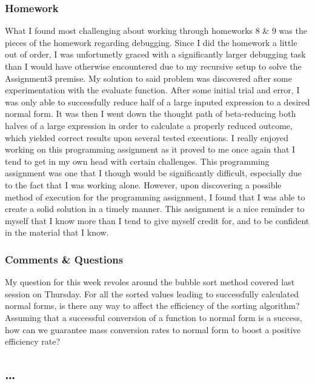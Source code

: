 \documentclass{article}
\theoremstyle{theorem}
\theoremstyle{definition}
\theoremstyle{remark}
\begin{document}
\subsubsection{Homework}
What I found most challenging about working through homeworks 8 \& 9 was the pieces of the homework regarding debugging. Since I did the homework a little out of order, I was unfortunetly graced with a significantly larger debugging task than I would have otherwise encountered due to my recursive setup to solve the Assignment3 premise.
\newline \newline My solution to said problem was discovered after some experimentation with the evaluate function. After some initial trial and error, I was only able to successfully reduce half of a large inputed expression to a desired normal form. It was then I went down the thought path of beta-reducing both halves of a large expression in order to calculate a properly reduced outcome, which yielded correct results upon several tested executions.
\newline \newline I really enjoyed working on this programming assignment as it proved to me once again that I tend to get in my own head with certain challenges. This programming assignment was one that I though would be significantly difficult, especially due to the fact that I was working alone. However, upon discovering a possible method of execution for the programming assignment, I found that I was able to create a solid solution in a timely manner. This assignment is a nice reminder to myself that I know more than I tend to give myself credit for, and to be confident in the material that I know.

\subsubsection{Comments \& Questions}

My question for this week revoles around the bubble sort method covered last session on Thursday. For all the sorted values leading to successfully calculated normal forms, is there any way to affect the efficiency of the sorting algorithm? Assuming that a successful conversion of a function to normal form is a success, how can we guarantee mass conversion rates to normal form to boost a positive efficiency rate?

\subsection{\ldots} 
\end{document}
